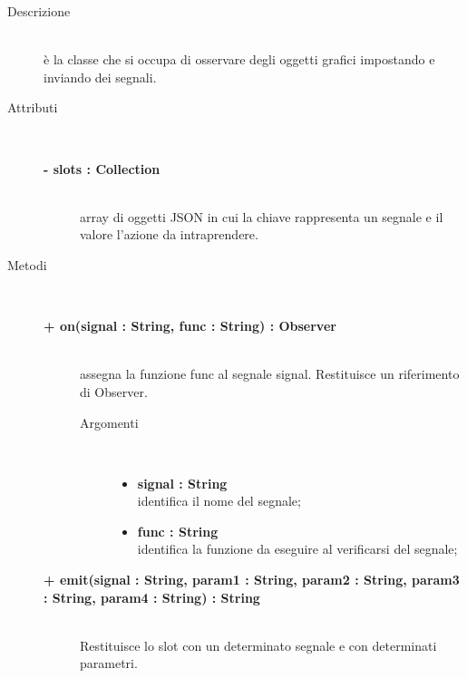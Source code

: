 \begin{description}
\item[Descrizione] \hfill \\
	è la classe che si occupa di osservare degli oggetti grafici impostando e inviando dei segnali.
		
	
\item[Attributi] \hfill \\
	\begin{description}
		\item[\textbf{- slots : Collection			}] \hfill \\
			array di oggetti JSON in cui la chiave rappresenta un segnale e il valore l'azione da intraprendere.
	\end{description}
	
	
\item[Metodi] \hfill \\

	\begin{description}
		\item[\textbf{\color{blue}+ on(signal : String, func : String) : Observer			}] \hfill \\
			assegna la funzione func al segnale signal. Restituisce un riferimento di Observer.
			
		\begin{description}
			\item[Argomenti] \hfill \\
				\begin{itemize}
				
					\item \textbf{signal : String			} \hfill \\
					identifica il nome del segnale;
					\item \textbf{func : String			} \hfill \\
					identifica la funzione da eseguire al verificarsi del segnale;			
				\end{itemize}
		\end{description}
	\end{description}		
	
	\begin{description}
		\item[\textbf{\color{blue}+ emit(signal : String, param1 : String, param2 : String, param3 : String, param4 : String) : String			}] \hfill \\
			Restituisce lo slot con un determinato segnale e con determinati parametri.
			

\end{description}
\end{description}

